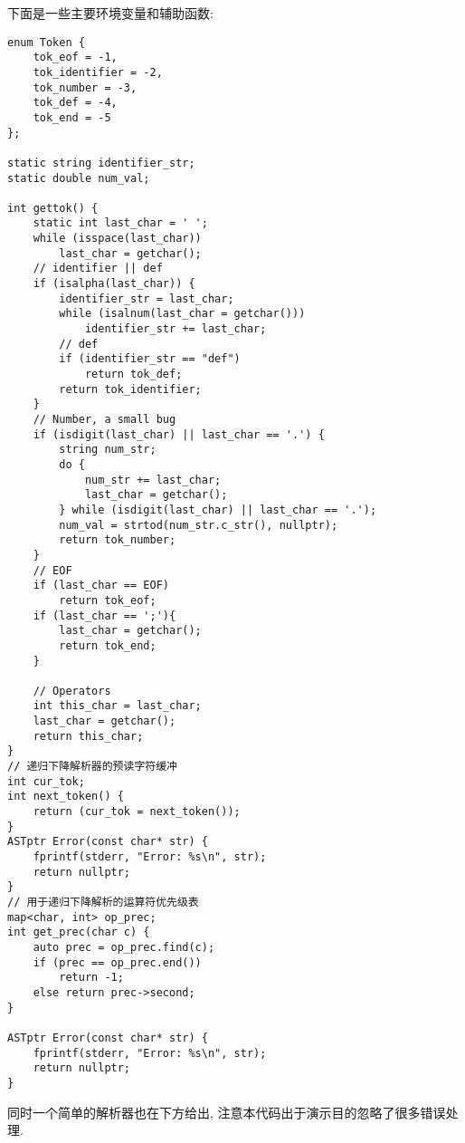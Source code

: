 \documentclass[UTF8]{ctexart}
\begin{document}
下面是一些主要环境变量和辅助函数:
\begin{lstlisting}[title=环境, frame=shadowbox]
enum Token {
    tok_eof = -1,
    tok_identifier = -2,
    tok_number = -3,
    tok_def = -4,
    tok_end = -5
};

static string identifier_str;
static double num_val;

int gettok() {
    static int last_char = ' ';
    while (isspace(last_char))
        last_char = getchar();
    // identifier || def
    if (isalpha(last_char)) {
        identifier_str = last_char;
        while (isalnum(last_char = getchar()))
            identifier_str += last_char;
        // def
        if (identifier_str == "def")
            return tok_def;
        return tok_identifier;
    }
    // Number, a small bug
    if (isdigit(last_char) || last_char == '.') {
        string num_str;
        do {
            num_str += last_char;
            last_char = getchar();
        } while (isdigit(last_char) || last_char == '.');
        num_val = strtod(num_str.c_str(), nullptr);
        return tok_number;
    }
    // EOF
    if (last_char == EOF)
        return tok_eof;
    if (last_char == ';'){
        last_char = getchar();
        return tok_end;
    }
        
    // Operators 
    int this_char = last_char;
    last_char = getchar();
    return this_char;
}
// 递归下降解析器的预读字符缓冲
int cur_tok; 
int next_token() {
    return (cur_tok = next_token());
}
ASTptr Error(const char* str) {
    fprintf(stderr, "Error: %s\n", str);
    return nullptr;
} 
// 用于递归下降解析的运算符优先级表
map<char, int> op_prec;
int get_prec(char c) {
    auto prec = op_prec.find(c);
    if (prec == op_prec.end())
        return -1;
    else return prec->second;
}

ASTptr Error(const char* str) {
    fprintf(stderr, "Error: %s\n", str);  
    return nullptr;
}
\end{lstlisting} 
同时一个简单的解析器也在下方给出, 注意本代码出于演示目的忽略了很多错误处理.
\end{document}
